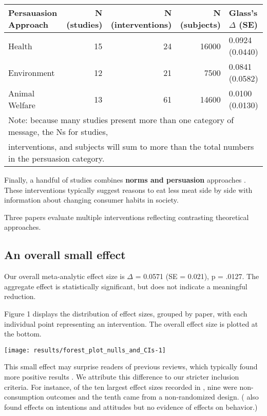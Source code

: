 \documentclass[sn-nature,pdflatex]{sn-jnl}
\begin{document}
\begin{table}[!h]
\centering
\begin{tabular}{lrrrl}
\toprule
Persauasion Approach & N (studies) & N (interventions) & N (subjects) & Glass's $\Delta$ (SE)\\
\midrule
Health & 15 & 24 & 16000 & 0.0924 (0.0440)\\
Environment & 12 & 21 & 7500 & 0.0841 (0.0582)\\
Animal Welfare & 13 & 61 & 14600 & 0.0100 (0.0130)\\
\bottomrule
\multicolumn{5}{l}{\textsuperscript{} Note: because many studies present more than one category of message, the Ns for studies, \linebreak}\\
\multicolumn{5}{l}{interventions, and subjects will sum to more than the total numbers in the persuasion category.}\\
\end{tabular}
\end{table}

Finally, a handful of studies combines \textbf{norms and persuasion}
approaches \citep{hennessy2016, carfora2023, mattson2020, piester2020}.
These interventions typically suggest reasons to eat less meat side by
side with information about changing consumer habits in society.

Three papers \citep{piester2020, hennessy2016, kanchanachitra2020}
evaluate multiple interventions reflecting contrasting theoretical
approaches.

\subsection{An overall small effect}\label{sec2.2}

Our overall meta-analytic effect size is \(\Delta\) = 0.0571 (SE =
0.021), p = .0127. The aggregate effect is statistically significant,
but does not indicate a meaningful reduction.

Figure 1 displays the distribution of effect sizes, grouped by paper,
with each individual point representing an intervention. The overall
effect size is plotted at the bottom.

\texttt{[image: results/forest\_plot\_nulls\_and\_CIs-1]}

This small effect may surprise readers of previous reviews, which
typically found more positive results
\citep{mathur2021meta, meier2022, chang2023}. We attribute this
difference to our stricter inclusion criteria. For instance, of the ten
largest effect sizes recorded in \citep{mathur2021effectiveness}, nine
were non-consumption outcomes and the tenth came from a non-randomized
design. (\citep{bianchi2018conscious} also found effects on intentions
and attitudes but no evidence of effects on behavior.)
\end{document}

